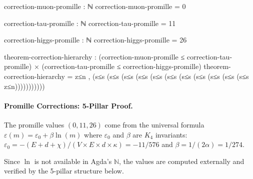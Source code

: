 \documentclass[11pt,a4paper]{book}
\begin{document}
\begin{code}
correction-muon-promille : ℕ
correction-muon-promille = 0

correction-tau-promille : ℕ
correction-tau-promille = 11

correction-higgs-promille : ℕ
correction-higgs-promille = 26

theorem-correction-hierarchy : (correction-muon-promille ≤ correction-tau-promille) × 
                                (correction-tau-promille ≤ correction-higgs-promille)
theorem-correction-hierarchy = z≤n , (s≤s (s≤s (s≤s (s≤s (s≤s (s≤s (s≤s (s≤s (s≤s (s≤s (s≤s z≤n)))))))))))

\end{code}

\paragraph{Promille Corrections: 5-Pillar Proof.}
The promille values $(0, 11, 26)$ come from the universal formula
$\varepsilon(m) = \varepsilon_0 + \beta \ln(m)$
where $\varepsilon_0$ and $\beta$ are $K_4$ invariants:
$\varepsilon_0 = -(E + d + \chi)/(V \times E \times d \times \kappa) = -11/576$
and $\beta = 1/(2\alpha) = 1/274$.

Since $\ln$ is not available in Agda's $\mathbb{N}$, the values are computed
externally and verified by the 5-pillar structure below.
\end{document}
